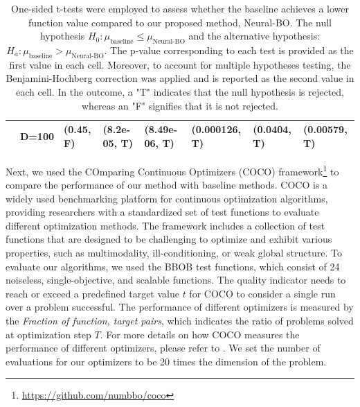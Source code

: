 \begin{table}[]
{\begin{tabular}{|cc|l|l|l|l|l|l|}
\multicolumn{1}{|c|}{}                                                                                  & D=100 & (0.45, F)                                                                             & (8.2e-05, T)                        & (8.49e-06, T)                      & (0.000126, T)                      & (0.0404, T)                        & (0.00579, T)                     \\ \hline
\end{tabular}
}
\caption{One-sided t-tests were employed to assess whether the baseline achieves a lower function value compared to our proposed method, Neural-BO.  The null hypothesis $H_0: \mu_\text{baseline} \le \mu_{\text{Neural-BO}}$ and the alternative hypothesis:  $H_a: \mu_\text{baseline} > \mu_{\text{Neural-BO}}$. The p-value corresponding to each test is provided as the first value in each cell. Moreover, to account for multiple hypotheses testing, the Benjamini-Hochberg correction was applied and is reported as the second value in each cell. In the outcome, a "T" indicates that the null hypothesis is rejected, whereas an "F" signifies that it is not rejected.}
\label{tab:t-test}
\end{table}


Next, we used the COmparing Continuous Optimizers (COCO) framework\footnote{ \url{https://github.com/numbbo/coco}} to compare the performance of our method with baseline methods. COCO is a widely used benchmarking platform for continuous optimization algorithms, providing researchers with a standardized set of test functions to evaluate different optimization methods. The framework includes a collection of test functions that are designed to be challenging to optimize and exhibit various properties, such as multimodality, ill-conditioning, or weak global structure. To evaluate our algorithms, we used the BBOB test functions, which consist of 24 noiseless, single-objective, and scalable functions. The quality indicator needs to reach or exceed a predefined target value  $t$  for COCO to consider a single run over a problem successful. The performance of different optimizers is measured by the \textit{Fraction of function, target pairs}, which indicates the ratio of problems solved at optimization step $T$. For more details on how COCO measures the performance of different optimizers, please refer to \citet{hansen2021coco}. We set the number of evaluations for our optimizers to be 20 times the dimension of the problem. 

